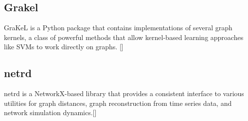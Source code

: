 \subsection{Grakel}
GraKeL is a Python package that contains implementations of several graph kernels, a class of powerful methods that allow kernel-based learning approaches like SVMs to work directly on graphs. [\cite{Siglidis:2018}]

\subsection{netrd}
netrd is a NetworkX-based library that provides a consistent interface to various utilities for graph distances, graph reconstruction from time series data, and network simulation dynamics.[\cite{McCabe:2019}]
